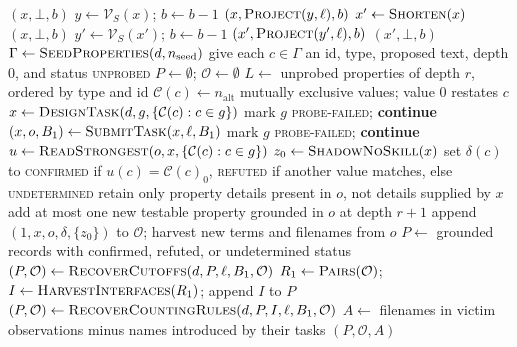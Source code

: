 \begin{algorithm*}[t]
\caption{Victim submission and Stage~1 property inference.}
\label{alg:dd-stage1}
\scriptsize
\begin{algorithmic}[1]
   \State \Return $(x,\bot,b)$ \EndIf
  \State $y\gets\mathcal{V}_S(x)$; $b\gets b-1$
   \State \Return $(x,\Call{Project}{y,\ell},b)$ \EndIf
  \State $x'\gets\Call{Shorten}{x}$
   \State \Return $(x,\bot,b)$ \EndIf
  \State $y'\gets\mathcal{V}_S(x')$; $b\gets b-1$
   \State \Return $(x',\Call{Project}{y',\ell},b)$ \EndIf
  \State \Return $(x',\bot,b)$
\EndProcedure
\Statex
{}
  \State $\Gamma\gets\Call{SeedProperties}{d,n_{\mathrm{seed}}}$
  \State give each $c\in\Gamma$ an id, type, proposed text, depth $0$, and
         status \textsc{unprobed}
  \State $P\gets\emptyset$; $\mathcal{O}\gets\emptyset$
    \State $L\gets$ unprobed properties of depth $r$, ordered by type and id
        \State $\mathcal{C}(c)\gets n_{\mathrm{alt}}$ mutually exclusive values;
               value $0$ restates $c$
      \EndFor
      \State $x\gets\Call{DesignTask}{d,g,\{\mathcal{C}(c):c\in g\}}$
        \State mark $g$ \textsc{probe-failed}; \textbf{continue}
      \EndIf
      \State $(x,o,B_1)\gets\Call{SubmitTask}{x,\ell,B_1}$
        \State mark $g$ \textsc{probe-failed}; \textbf{continue}
      \EndIf
      \State $u\gets\Call{ReadStrongest}{o,x,\{\mathcal{C}(c):c\in g\}}$
      \State $z_0\gets\Call{ShadowNoSkill}{x}$ 
        \State set $\delta(c)$ to \textsc{confirmed} if $u(c)=\mathcal{C}(c)_0$,
               \textsc{refuted} if another value matches, else \textsc{undetermined}
        \State retain only property details present in $o$, not details supplied by $x$
          \State add at most one new testable property grounded in $o$ at depth $r+1$
        \EndIf
      \EndFor
      \State append $(1,x,o,\delta,\{z_0\})$ to $\mathcal{O}$; harvest new terms and filenames from $o$
    \EndFor
  \EndFor
  \State $P\gets$ grounded records with confirmed, refuted, or undetermined status
  \State $(P,\mathcal{O})\gets\Call{RecoverCutoffs}{d,P,\ell,B_1,\mathcal{O}}$
  \State $R_1\gets\Call{Pairs}{\mathcal{O}}$;
         $I\gets\Call{HarvestInterfaces}{R_1}$; append $I$ to $P$
  \State $(P,\mathcal{O})\gets\Call{RecoverCountingRules}{d,P,I,\ell,B_1,\mathcal{O}}$
  \State $A\gets$ filenames in victim observations minus names introduced by their tasks
  \State \Return $(P,\mathcal{O},A)$
\EndProcedure
\end{algorithmic}
\end{algorithm*}

